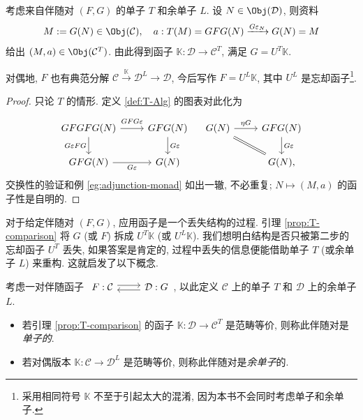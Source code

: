 \begin{lemma}\label{prop:T-comparison}
	考虑来自伴随对 $(F, G)$ 的单子 $T$ 和余单子 $L$. 设 $N \in \Obj(\mathcal{D})$, 则资料
	\[ M := G(N) \in \Obj(\mathcal{C}), \quad a: T(M) = GFG(N) \xrightarrow{G\varepsilon_N} G(N) = M \]
	给出 $(M, a) \in \Obj(\mathcal{C}^T)$. 由此得到函子 $\mathbb{K}: \mathcal{D} \to \mathcal{C}^T$, 满足 $G = U^T \mathbb{K}$.
	
	对偶地, $F$ 也有典范分解 $\mathcal{C} \xrightarrow{\mathbb{K}} \mathcal{D}^L \to \mathcal{D}$, 今后写作 $F = U^L \mathbb{K}$, 其中 $U^L$ 是忘却函子\footnote{采用相同符号 $\mathbb{K}$ 不至于引起太大的混淆, 因为本书不会同时考虑单子和余单子.}.
\end{lemma}
\begin{proof}
	只论 $T$ 的情形. 定义 \ref{def:T-Alg} 的图表对此化为
	\[\begin{tikzcd}
		GFGFG(N) \arrow[r, "GFG\varepsilon" inner sep=0.5em] \arrow[d, "{G\varepsilon FG}"'] & GFG(N) \arrow[d, "G\varepsilon"] \\
		GFG(N) \arrow[r, "G\varepsilon"'] & G(N)
	\end{tikzcd} \quad \begin{tikzcd}
		G(N) \arrow[r, "\eta G"] \arrow[equal, rd] & GFG(N) \arrow[d, "{G\varepsilon}"] \\
		& G(N),
	\end{tikzcd} \]
	交换性的验证和例 \ref{eg:adjunction-monad} 如出一辙, 不必重复; $N \mapsto (M, a)$ 的函子性是自明的.
\end{proof}

对于给定伴随对 $(F, G)$, 应用函子是一个丢失结构的过程. 引理 \ref{prop:T-comparison} 将 $G$ (或 $F$) 拆成 $U^T \mathbb{K}$ (或 $U^L \mathbb{K}$). 我们想明白结构是否只被第二步的忘却函子 $U^T$ 丢失, 如果答案是肯定的, 过程中丢失的信息便能借助单子 $T$ (或余单子 $L$) 来重构. 这就启发了以下概念.

\begin{definition}\label{def:monadic}
	考虑一对伴随函子
	$\begin{tikzcd}
		F: \mathcal{C} \arrow[shift left, r] & \mathcal{D}: G \arrow[shift left, l]
	\end{tikzcd}$,
	以此定义 $\mathcal{C}$ 上的单子 $T$ 和 $\mathcal{D}$ 上的余单子 $L$.
	\begin{itemize}
		\item 若引理 \ref{prop:T-comparison} 的函子 $\mathbb{K}: \mathcal{D} \to \mathcal{C}^T$ 是范畴等价, 则称此伴随对是\emph{单子的}.
		\item 若对偶版本 $\mathbb{K}: \mathcal{C} \to \mathcal{D}^L$ 是范畴等价, 则称此伴随对是\emph{余单子}的.
	\end{itemize}
\end{definition}
